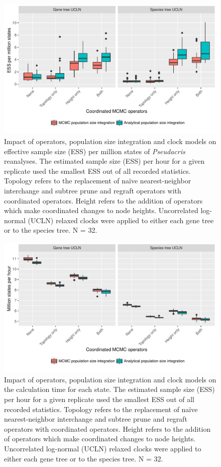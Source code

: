 \documentclass[12pt]{article}
\begin{document}
\begin{figure}[htb!]
\centering
\includegraphics[width=\textwidth]{minimum_ess_per_mstates_boxplot.pdf}
\caption
{Impact of operators, population size integration and clock models on effective
sample size (ESS) per million states of \textit{Pseudacris} reanalyses. The
estimated sample size (ESS) per hour for a given replicate used the smallest ESS
out of all recorded statistics. Topology refers to the replacement of na\"ive
nearest-neighbor interchange and subtree prune and regraft operators with
coordinated operators. Height refers to the addition of operators which make
coordinated changes to node heights. Uncorrelated log-normal (UCLN) relaxed
clocks were applied to either each gene tree or to the species tree. N = 32.}
\label{fig:realEssPerMstates}
\end{figure}

\clearpage

\begin{figure}[htb!]
\centering
\includegraphics[width=\textwidth]{mstates_rates.pdf}
\caption
{Impact of operators, population size integration and clock models on the
calculation time for each state. The estimated sample size (ESS) per hour for a
given replicate used the smallest ESS out of all recorded statistics. Topology
refers to the replacement of na\"ive nearest-neighbor interchange and subtree
prune and regraft operators with coordinated operators. Height refers to the
addition of operators which make coordinated changes to node heights.
Uncorrelated log-normal (UCLN) relaxed clocks were applied to either each gene
tree or to the species tree. N = 32.}
\label{fig:mstatesPerHour}
\end{figure}
\end{document}
